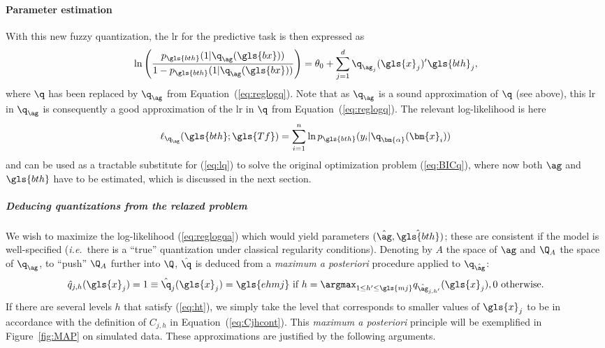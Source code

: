 \paragraph{Parameter estimation}

With this new fuzzy quantization, the \gls{lr} for the predictive task is then expressed as
\begin{equation}
    \label{eq:reglogqa}
    \ln \left( \dfrac{p_{\gls{bth}}(1|\q_{\ag} (\gls{bx}))}{1 - p_{\gls{bth}}(1|\q_{\ag} (\gls{bx}))} \right) = \theta_0 + \sum_{j=1}^d { \q_{\ag_{j}}(\gls{x}_j)' \gls{bth}_j },
\end{equation}
where $\q$ has been replaced by $\q_{\ag}$ from Equation~(\ref{eq:reglogq}).
Note that as $\q_{\ag}$ is a sound approximation of $\q$ (see above), this \gls{lr} in $\q_{\ag}$ is consequently a good approximation of the \gls{lr} in $\q$ from Equation~(\ref{eq:reglogq}). The relevant log-likelihood is here 
\begin{equation}
    \label{eq:lqa}
    \ell_{\q_{\ag}}(\gls{bth} ; \gls{Tf})=\sum_{i=1}^n \ln p_{\gls{bth}}(y_i|\q_{\bm{\alpha}}(\bm{x}_i))
\end{equation}
and can be used as a tractable substitute for (\ref{eq:lq}) to solve the original optimization problem (\ref{eq:BICq}), where now both $\ag$ and $\gls{bth}$ have to be estimated, which is discussed in the next section. 

\subparagraph{Deducing quantizations from the relaxed problem}

We wish to maximize the log-likelihood (\ref{eq:reglogqa}) which would yield parameters $(\hat{\ag},\hat{\gls{bth}})$; these are consistent if the model is well-specified (\textit{i.e.}\ there is a ``true'' quantization under classical regularity conditions). Denoting by $A$ the space of $\ag$ and $\Q_A$ the space of $\q_{\ag}$, to ``push'' $\Q_A$ further into $\Q$, $\hat{\q}$ is deduced from a \textit{maximum a posteriori} procedure applied to $\q_{\hat{\ag}}$:
\begin{equation}
    \label{eq:ht}
    \hat{q}_{j,h}(\gls{x}_j) = 1 \equiv \hat{\q}_j(\gls{x}_j) = \gls{ehmj} \text{ if } h = \argmax_{1 \leq h' \leq \gls{mj}} q_{\hat{\ag}_{j,h'}}(\gls{x}_j), 0 \text{ otherwise.}
\end{equation}
If there are several levels $h$ that satisfy (\ref{eq:ht}), we simply take the level that corresponds to smaller values of $\gls{x}_j$ to be in accordance with the definition of $C_{j,h}$ in Equation~(\ref{eq:Cjhcont}). This {\it maximum a posteriori} principle will be exemplified in Figure~\ref{fig:MAP} on simulated data. These approximations are justified by the following arguments. 

